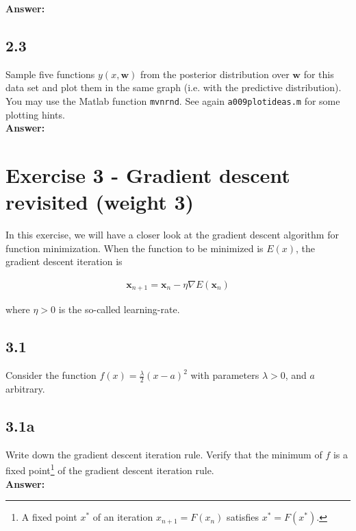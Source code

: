 \documentclass[a4paper]{article}
\begin{document}
\textbf{Answer:}\\



\subsection*{2.3}

Sample five functions $y(x,\textbf{w})$ from the posterior distribution over $\textbf{w}$ for this data set and plot them in the same graph (i.e. with the predictive distribution). You may use the Matlab function \texttt{mvnrnd}. See again \texttt{a009plotideas.m} for some plotting hints.\\

\textbf{Answer:}\\



\section*{Exercise 3 - Gradient descent revisited (weight 3)}

In this exercise, we will have a closer look at the gradient descent algorithm for function minimization. When the function to be minimized is $E(x)$, the gradient descent iteration is


\begin{eqnarray}
\textbf{x}_{n + 1} = \textbf{x}_n - \eta \nabla E(\textbf{x}_n)
\end{eqnarray}

where $\eta > 0$ is the so-called learning-rate.

\subsection*{3.1}

Consider the function $f(x) = \frac{\lambda}{2}(x - a)^2$ with parameters $\lambda > 0$, and $a$ arbitrary.


\subsection*{3.1a}

Write down the gradient descent iteration rule. Verify that the minimum of $f$ is a fixed point\footnote{A fixed point $x^*$ of an iteration $x_{n+1} = F(x_n)$ satisfies $x^* = F(x^*)$.} of the gradient descent iteration rule.\\

\textbf{Answer:}\\
\end{document}
